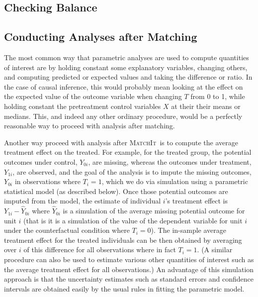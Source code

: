 \documentclass[oneside,letterpaper,titlepage]{article}
\newcommand{\MatchIt}{\textsc{MatchIt}}
\begin{document}
\subsection{Checking Balance}


\subsection{Conducting Analyses after Matching}

The most common way that parametric analyses are used to compute
quantities of interest are by holding constant some explanatory
variables, changing others, and computing predicted or expected values
and taking the difference or ratio.  In the case of causal inference,
this would probably mean looking at the effect on the expected value
of the outcome variable when changing $T$ from 0 to 1, while holding
constant the pretreatment control variables $X$ at their their means
or medians.  This, and indeed any other ordinary procedure, would be a
perfectly reasonable way to proceed with analysis after matching.

Another way proceed with analysis after \MatchIt\ is to compute the
average treatment effect on the treated.  For example, for the treated
group, the potential outcomes under control, $Y_{0i}$, are missing,
whereas the outcomes under treatment, $Y_{1i}$, are observed, and the
goal of the analysis is to impute the missing outcomes, $Y_{0i}$ in
observations where $T_i=1$, which we do via simulation using a
parametric statistical model (as described below).  Once those
potential outcomes are imputed from the model, the estimate of
individual $i$'s treatment effect is $Y_{1i}-\widehat{Y}_{0i}$ where
$\widehat{Y}_{0i}$ is a simulation of the average missing potential
outcome for unit $i$ (that is it is a simulation of the value of the
dependent variable for unit $i$ under the counterfactual condition
where $T_i=0$).  The in-sample average treatment effect for the
treated individuals can be then obtained by averaging over $i$ of this
difference for all observations where in fact $T_i=1$.  (A similar
procedure can also be used to estimate various other quantities of
interest such as the average treatment effect for all observations.)
An advantage of this simulation approach is that the uncertainty
estimates such as standard errors and confidence intervals are
obtained easily by the usual rules in fitting the parametric model.
\end{document}
